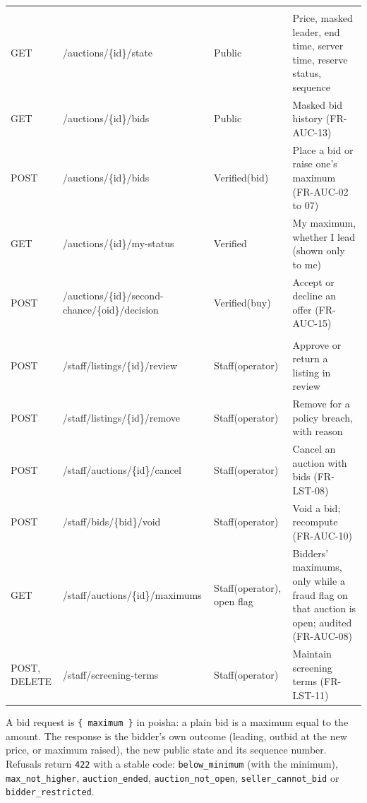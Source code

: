 \documentclass[11pt,a4paper]{article}
\begin{document}
{\begin{longtable}{@{}>{\ttfamily\raggedright\arraybackslash}p{1.15cm}>{\ttfamily\raggedright\arraybackslash}p{4.6cm}>{\raggedright\arraybackslash}p{2.7cm}>{\raggedright\arraybackslash}p{6.5cm}@{}}
\multicolumn{4}{@{}l}{\textbf{Auctions}} \\
GET & /\allowbreak auctions/\allowbreak \{id\}/\allowbreak state & Public & Price, masked leader, end time, server time, reserve status, sequence \\
GET & /\allowbreak auctions/\allowbreak \{id\}/\allowbreak bids & Public & Masked bid history (FR-AUC-13) \\
POST & /\allowbreak auctions/\allowbreak \{id\}/\allowbreak bids & Verified(bid) & Place a bid or raise one's maximum (FR-AUC-02 to 07) \\
GET & /\allowbreak auctions/\allowbreak \{id\}/\allowbreak my-\allowbreak status & Verified & My maximum, whether I lead (shown only to me) \\
POST & /\allowbreak auctions/\allowbreak \{id\}/\allowbreak second-\allowbreak chance/\allowbreak \{oid\}/\allowbreak decision & Verified(buy) & Accept or decline an offer (FR-AUC-15) \\
\multicolumn{4}{@{}l}{\textbf{Staff}} \\
POST & /\allowbreak staff/\allowbreak listings/\allowbreak \{id\}/\allowbreak review & Staff(operator) & Approve or return a listing in review \\
POST & /\allowbreak staff/\allowbreak listings/\allowbreak \{id\}/\allowbreak remove & Staff(operator) & Remove for a policy breach, with reason \\
POST & /\allowbreak staff/\allowbreak auctions/\allowbreak \{id\}/\allowbreak cancel & Staff(operator) & Cancel an auction with bids (FR-LST-08) \\
POST & /\allowbreak staff/\allowbreak bids/\allowbreak \{bid\}/\allowbreak void & Staff(operator) & Void a bid; recompute (FR-AUC-10) \\
GET & /\allowbreak staff/\allowbreak auctions/\allowbreak \{id\}/\allowbreak maximums & Staff(operator), open flag & Bidders' maximums, only while a fraud flag on that auction is open; audited (FR-AUC-08) \\
POST, DELETE & /\allowbreak staff/\allowbreak screening-\allowbreak terms & Staff(operator) & Maintain screening terms (FR-LST-11) \\
\bottomrule
\end{longtable}
}

A bid request is \texttt{\{ maximum \}} in poisha: a plain bid is a maximum equal to the amount. The response is the bidder's own outcome (leading, outbid at the new price, or maximum raised), the new public state and its sequence number. Refusals return \texttt{422} with a stable code: \texttt{below\_minimum} (with the minimum), \texttt{max\_not\_higher}, \texttt{auction\_ended}, \texttt{auction\_not\_open}, \texttt{seller\_cannot\_bid} or \texttt{bidder\_restricted}.
\end{document}
